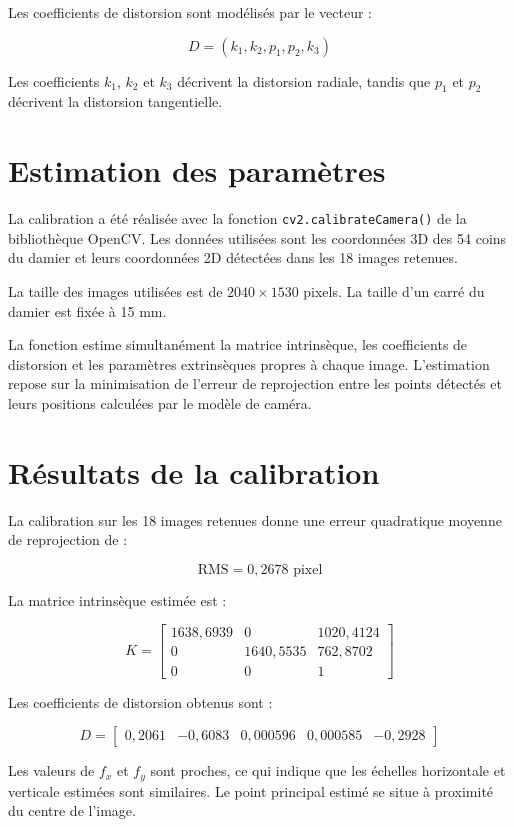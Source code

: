 \documentclass[12pt,a4paper]{report}
\begin{document}
Les coefficients de distorsion sont modélisés par le vecteur :

\[
D = (k_1, k_2, p_1, p_2, k_3)
\]

Les coefficients $k_1$, $k_2$ et $k_3$ décrivent la distorsion radiale, tandis que $p_1$ et $p_2$ décrivent la distorsion tangentielle.

\section{Estimation des paramètres}

La calibration a été réalisée avec la fonction \texttt{cv2.calibrateCamera()} de la bibliothèque OpenCV. Les données utilisées sont les coordonnées 3D des 54 coins du damier et leurs coordonnées 2D détectées dans les 18 images retenues.

La taille des images utilisées est de $2040 \times 1530$ pixels. La taille d'un carré du damier est fixée à 15 mm.

La fonction estime simultanément la matrice intrinsèque, les coefficients de distorsion et les paramètres extrinsèques propres à chaque image. L'estimation repose sur la minimisation de l'erreur de reprojection entre les points détectés et leurs positions calculées par le modèle de caméra.

\section{Résultats de la calibration}

La calibration sur les 18 images retenues donne une erreur quadratique moyenne de reprojection de :

\[
\boxed{\mathrm{RMS} = 0{,}2678 \text{ pixel}}
\]

La matrice intrinsèque estimée est :

\[
K =
\begin{bmatrix}
1638{,}6939 & 0 & 1020{,}4124 \\
0 & 1640{,}5535 & 762{,}8702 \\
0 & 0 & 1
\end{bmatrix}
\]

Les coefficients de distorsion obtenus sont :

\[
D =
\begin{bmatrix}
0{,}2061 &
-0{,}6083 &
0{,}000596 &
0{,}000585 &
-0{,}2928
\end{bmatrix}
\]

Les valeurs de $f_x$ et $f_y$ sont proches, ce qui indique que les échelles horizontale et verticale estimées sont similaires. Le point principal estimé se situe à proximité du centre de l'image.
\end{document}
